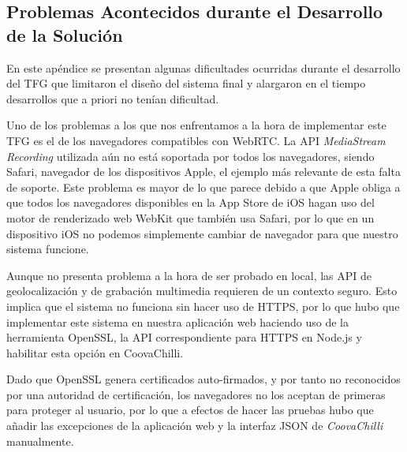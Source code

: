 \begin{appendices}
\clearpage
{}%
\begin{center}
\begin{minipage}{.75\textwidth}
\section{Problemas Acontecidos durante el Desarrollo de la Solución}\label{ApendiceE}

En este apéndice se presentan algunas dificultades ocurridas durante el desarrollo del TFG que limitaron el diseño del sistema final y alargaron en el tiempo desarrollos que a priori no tenían dificultad.
\end{minipage}
\end{center}
\clearpage%

Uno de los problemas a los que nos enfrentamos a la hora de implementar este TFG es el de los navegadores compatibles con WebRTC. La API \emph{MediaStream Recording} utilizada aún no está soportada por todos los navegadores, siendo Safari, navegador de los dispositivos Apple, el ejemplo más relevante de esta falta de soporte. Este problema es mayor de lo que parece debido a que Apple obliga a que todos los navegadores disponibles en la App Store de iOS hagan uso del motor de renderizado web WebKit que también usa Safari, por lo que en un dispositivo iOS no podemos simplemente cambiar de navegador para que nuestro sistema funcione.

Aunque no presenta problema a la hora de ser probado en local, las API de geolocalización y de grabación multimedia requieren de un contexto seguro. Esto implica que el sistema no funciona sin hacer uso de HTTPS, por lo que hubo que implementar este sistema en nuestra aplicación web haciendo uso de la herramienta OpenSSL, la API correspondiente para \acrshort{HTTPS} en Node.js y habilitar esta opción en CoovaChilli.

Dado que OpenSSL genera certificados auto-firmados, y por tanto no reconocidos por una autoridad de certificación, los navegadores no los aceptan de primeras para proteger al usuario, por lo que a efectos de hacer las pruebas hubo que añadir las excepciones de la aplicación web y la interfaz JSON de \emph{CoovaChilli} manualmente.


\end{appendices}
